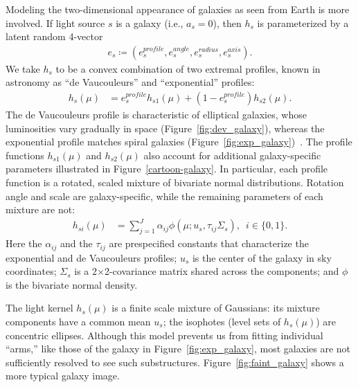 Modeling the two-dimensional appearance of galaxies as seen from Earth is more involved. If light source $s$ is a galaxy (i.e., ${a_s = 0}$), then $h_s$ is parameterized by a latent random 4-vector
\begin{align}
e_s \coloneqq (e_s^{profile}, e_s^{angle}, e_s^{radius}, e_s^{axis}).
\end{align}
We take $h_s$ to be a convex combination of two extremal profiles,
known in astronomy as ``de Vaucouleurs'' and ``exponential''
profiles:
\begin{align}
h_{s}(\mu) &= e_s^{profile} h_{s1}(\mu) + (1 - e_s^{profile}) h_{s2}(\mu).
\end{align}
The de Vaucouleurs profile is characteristic of elliptical galaxies, whose luminosities vary gradually in space (Figure~\ref{fig:dev_galaxy}), whereas the exponential profile matches spiral galaxies (Figure~\ref{fig:exp_galaxy})~\citep{feigelson2012modern}.
The profile functions $h_{s1}(\mu)$ and $h_{s2}(\mu)$ also account for additional galaxy-specific parameters illustrated in Figure~\ref{cartoon-galaxy}. In particular,
each profile function is a rotated, scaled mixture of bivariate normal distributions. Rotation angle and scale are galaxy-specific, while the remaining parameters of each mixture are not:
\begin{align}
  h_{si}(\mu)
  & = \sum_{j=1}^{J} \alpha_{ij} \phi(\mu; u_{s}, \tau_{ij} \Sigma_{s}),\,\,\, i \in \{0,1\}.\label{eq:hsi}
\end{align}
Here the $\alpha_{ij}$ and the $\tau_{ij}$ are prespecified constants that characterize the exponential and de Vaucouleurs profiles; $u_s$ is the center of the galaxy in sky coordinates; $\Sigma_s$ is a 2$\times$2-covariance matrix shared across the components; and $\phi$ is the bivariate normal density.

The light kernel $h_s(\mu)$ is a finite scale mixture of Gaussians: its mixture
components have a common mean $u_s$; the isophotes (level sets of
$h_s(\mu)$) are concentric ellipses. Although this model
prevents us from fitting individual ``arms,'' like those of the galaxy in
Figure~\ref{fig:exp_galaxy}, most galaxies
are not sufficiently resolved to see such substructures.
Figure~\ref{fig:faint_galaxy} shows a more typical galaxy image.

